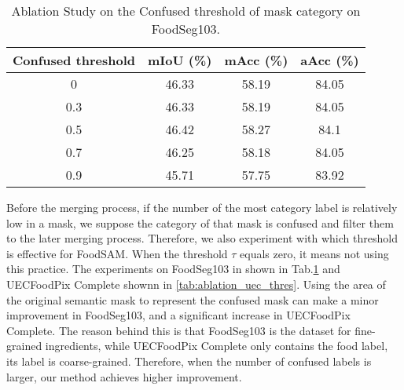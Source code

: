 \documentclass[lettersize,journal]{IEEEtran}
\begin{document}
\begin{table}[]
\centering
\caption{Ablation Study on the Confused threshold of mask category on FoodSeg103.}
\begin{tabular}{c|ccc}
\hline
\textbf{Confused threshold}             & \textbf{mIoU (\%)} & \textbf{mAcc (\%)} & \textbf{aAcc (\%)} \\ \hline
0                        & 46.33      & 58.19       & 84.05                             \\
0.3                      & 46.33      & 58.19       & 84.05                             \\ 
0.5                      & 46.42      &  58.27      & 84.1                              \\
0.7                      & 46.25      & 58.18       & 84.05                             \\
0.9                      & 45.71      & 57.75       & 83.92                             \\ \hline
\end{tabular}
\captionsetup{justification=centering}
\label{tab:ablation_thres}
\end{table}
 
Before the merging process, if the number of the most category label is relatively low in a mask, we suppose the category of that mask is confused and filter them to the later merging process. 
Therefore, we also experiment with which threshold is effective for FoodSAM.
When the threshold $\tau$ equals zero, it means not using this practice.
The experiments on FoodSeg103 in shown in Tab.\ref{tab:ablation_thres} and UECFoodPix Complete shownn in \ref{tab:ablation_uec_thres}. 
Using the area of the original semantic mask to represent the confused mask can make a minor improvement in FoodSeg103, and a significant increase in UECFoodPix Complete. 
The reason behind this is that FoodSeg103 is the dataset for fine-grained ingredients, while UECFoodPix Complete only contains the food label, its label is coarse-grained. 
Therefore, when the number of confused labels is larger, our method achieves higher improvement. 
\end{document}
